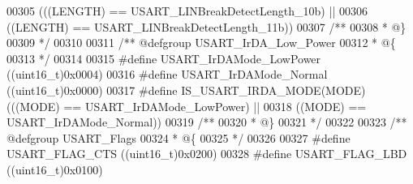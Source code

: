 \begin{DoxyCode}
00305                                \textcolor{preprocessor}{(}\textcolor{preprocessor}{(}\textcolor{preprocessor}{(}\textcolor{preprocessor}{LENGTH}\textcolor{preprocessor}{)} \textcolor{preprocessor}{==} USART_LINBreakDetectLength_10b\textcolor{preprocessor}{)} \textcolor{preprocessor}{||}
00306                                 \textcolor{preprocessor}{(}\textcolor{preprocessor}{(}\textcolor{preprocessor}{LENGTH}\textcolor{preprocessor}{)} \textcolor{preprocessor}{==} USART_LINBreakDetectLength_11b\textcolor{preprocessor}{)}\textcolor{preprocessor}{)}
00307 \textcolor{comment}{/**}
00308 \textcolor{comment}{  * @\}}
00309 \textcolor{comment}{  */}
00310 
00311 \textcolor{comment}{/** @defgroup USART\_IrDA\_Low\_Power }
00312 \textcolor{comment}{  * @\{}
00313 \textcolor{comment}{  */}
00314 
00315 \textcolor{preprocessor}{#}\textcolor{preprocessor}{define} \textcolor{preprocessor}{USART\_IrDAMode\_LowPower}              \textcolor{preprocessor}{(}\textcolor{preprocessor}{(}\textcolor{preprocessor}{uint16\_t}\textcolor{preprocessor}{)}0x0004\textcolor{preprocessor}{)}
00316 \textcolor{preprocessor}{#}\textcolor{preprocessor}{define} \textcolor{preprocessor}{USART\_IrDAMode\_Normal}                \textcolor{preprocessor}{(}\textcolor{preprocessor}{(}\textcolor{preprocessor}{uint16\_t}\textcolor{preprocessor}{)}0x0000\textcolor{preprocessor}{)}
00317 \textcolor{preprocessor}{#}\textcolor{preprocessor}{define} \textcolor{preprocessor}{IS\_USART\_IRDA\_MODE}\textcolor{preprocessor}{(}\textcolor{preprocessor}{MODE}\textcolor{preprocessor}{)} \textcolor{preprocessor}{(}\textcolor{preprocessor}{(}\textcolor{preprocessor}{(}\textcolor{preprocessor}{MODE}\textcolor{preprocessor}{)} \textcolor{preprocessor}{==} USART_IrDAMode_LowPower\textcolor{preprocessor}{)} \textcolor{preprocessor}{||}
00318                                   \textcolor{preprocessor}{(}\textcolor{preprocessor}{(}\textcolor{preprocessor}{MODE}\textcolor{preprocessor}{)} \textcolor{preprocessor}{==} USART_IrDAMode_Normal\textcolor{preprocessor}{)}\textcolor{preprocessor}{)}
00319 \textcolor{comment}{/**}
00320 \textcolor{comment}{  * @\}}
00321 \textcolor{comment}{  */}
00322 
00323 \textcolor{comment}{/** @defgroup USART\_Flags }
00324 \textcolor{comment}{  * @\{}
00325 \textcolor{comment}{  */}
00326 
00327 \textcolor{preprocessor}{#}\textcolor{preprocessor}{define} \textcolor{preprocessor}{USART\_FLAG\_CTS}                       \textcolor{preprocessor}{(}\textcolor{preprocessor}{(}\textcolor{preprocessor}{uint16\_t}\textcolor{preprocessor}{)}0x0200\textcolor{preprocessor}{)}
00328 \textcolor{preprocessor}{#}\textcolor{preprocessor}{define} \textcolor{preprocessor}{USART\_FLAG\_LBD}                       \textcolor{preprocessor}{(}\textcolor{preprocessor}{(}\textcolor{preprocessor}{uint16\_t}\textcolor{preprocessor}{)}0x0100\textcolor{preprocessor}{)}

\end{DoxyCode}
